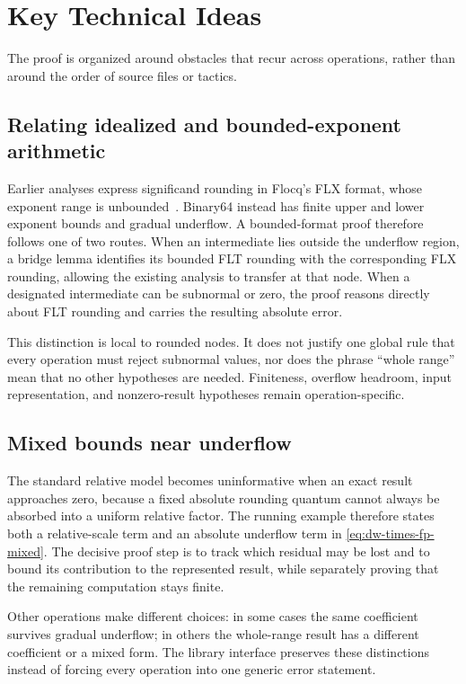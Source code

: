 \section{Key Technical Ideas}
\label{sec:ideas}

The proof is organized around obstacles that recur across operations, rather
than around the order of source files or tactics.

\subsection{Relating idealized and bounded-exponent arithmetic}

Earlier analyses express significand rounding in Flocq's FLX format, whose
exponent range is unbounded~\cite{Rideau2022}.  Binary64 instead has finite
upper and lower exponent bounds and gradual underflow.  A bounded-format proof
therefore follows one of two routes.  When an intermediate lies outside the
underflow region, a bridge lemma identifies its bounded FLT rounding with the
corresponding FLX rounding, allowing the existing analysis to transfer at that
node.  When a designated intermediate can be subnormal or zero, the proof
reasons directly about FLT rounding and carries the resulting absolute error.

This distinction is local to rounded nodes.  It does not justify one global
rule that every operation must reject subnormal values, nor does the phrase
``whole range'' mean that no other hypotheses are needed.  Finiteness,
overflow headroom, input representation, and nonzero-result hypotheses remain
operation-specific.

\subsection{Mixed bounds near underflow}

The standard relative model becomes uninformative when an exact result
approaches zero, because a fixed absolute rounding quantum cannot always be
absorbed into a uniform relative factor.  The running example therefore states
both a relative-scale term and an absolute underflow term in
\eqref{eq:dw-times-fp-mixed}.  The decisive proof step is to track which residual
may be lost and to bound its contribution to the represented result, while
separately proving that the remaining computation stays finite.

Other operations make different choices: in some cases the same coefficient
survives gradual underflow; in others the whole-range result has a different
coefficient or a mixed form.  The library interface preserves these distinctions
instead of forcing every operation into one generic error statement.

